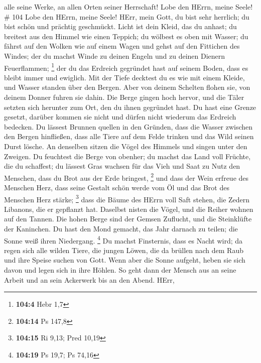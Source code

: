 alle seine Werke, an allen Orten seiner Herrschaft! Lobe den HErrn,
meine Seele! \# 104  Lobe den HErrn, meine Seele! HErr, mein
Gott, du bist sehr herrlich; du bist schön und prächtig geschmückt.
 Licht ist dein Kleid, das du anhast; du breitest aus den
Himmel wie einen Teppich;  du wölbest es oben mit Wasser; du
fährst auf den Wolken wie auf einem Wagen und gehst auf den Fittichen
des Windes;  der du machst Winde zu deinen Engeln und zu
deinen Dienern Feuerflammen; \footnote{\textbf{104:4} Hebr 1,7}
 der du das Erdreich gegründet hast auf seinem Boden, dass
es bleibt immer und ewiglich.  Mit der Tiefe decktest du es
wie mit einem Kleide, und Wasser standen über den Bergen. 
Aber von deinem Schelten flohen sie, von deinem Donner fuhren sie dahin.
 Die Berge gingen hoch hervor, und die Täler setzten sich
herunter zum Ort, den du ihnen gegründet hast.  Du hast eine
Grenze gesetzt, darüber kommen sie nicht und dürfen nicht wiederum das
Erdreich bedecken.  Du lässest Brunnen quellen in den
Gründen, dass die Wasser zwischen den Bergen hinfließen, 
dass alle Tiere auf dem Felde trinken und das Wild seinen Durst lösche.
 An denselben sitzen die Vögel des Himmels und singen unter
den Zweigen.  Du feuchtest die Berge von obenher; du machst
das Land voll Früchte, die du schaffest;  du lässest Gras
wachsen für das Vieh und Saat zu Nutz den Menschen, dass du Brot aus der
Erde bringest, \footnote{\textbf{104:14} Ps 147,8}  und
dass der Wein erfreue des Menschen Herz, dass seine Gestalt schön werde
vom Öl und das Brot des Menschen Herz stärke; \footnote{\textbf{104:15}
  Ri 9,13; Pred 10,19}  dass die Bäume des HErrn voll Saft
stehen, die Zedern Libanons, die er gepflanzt hat. 
Daselbst nisten die Vögel, und die Reiher wohnen auf den Tannen.
 Die hohen Berge sind der Gemsen Zuflucht, und die
Steinklüfte der Kaninchen.  Du hast den Mond gemacht, das
Jahr darnach zu teilen; die Sonne weiß ihren Niedergang. \footnote{\textbf{104:19}
  Ps 19,7; Ps 74,16}  Du machst Finsternis, dass es Nacht
wird; da regen sich alle wilden Tiere,  die jungen Löwen,
die da brüllen nach dem Raub und ihre Speise suchen von Gott.
 Wenn aber die Sonne aufgeht, heben sie sich davon und
legen sich in ihre Höhlen.  So geht dann der Mensch aus an
seine Arbeit und an sein Ackerwerk bis an den Abend.  HErr,
